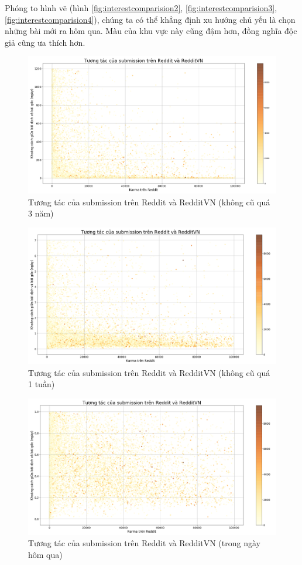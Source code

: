 \documentclass[10pt,a4paper]{article}
\begin{document}
Phóng to hình vẽ (hình \eqref{fig:interestcomparision2}, \eqref{fig:interestcomparision3}, \eqref{fig:interestcomparision4}), chúng ta có thể khẳng định xu hướng chủ yếu là chọn những bài mới ra hôm qua. Màu của khu vực này cũng đậm hơn, đồng nghĩa độc giả cũng ưa thích hơn.
\begin{figure}[!hb]
    \centering
    \includegraphics[width=\textwidth]{img/InterestComparision_1200D.png}
    \caption{Tương tác của submission trên Reddit và RedditVN (không cũ quá 3 năm)}
    \label{fig:interestcomparision2}
\end{figure}
\begin{figure}[!ht]
    \centering
    \includegraphics[width=\textwidth]{img/InterestComparision_7D.png}
    \caption{Tương tác của submission trên Reddit và RedditVN (không cũ quá 1 tuần)}
    \label{fig:interestcomparision3}
\end{figure}
\begin{figure}[!hb]
    \centering
    \includegraphics[width=\textwidth]{img/InterestComparision_1D.png}
    \caption{Tương tác của submission trên Reddit và RedditVN (trong ngày hôm qua)}
    \label{fig:interestcomparision4}
\end{figure}
\end{document}
